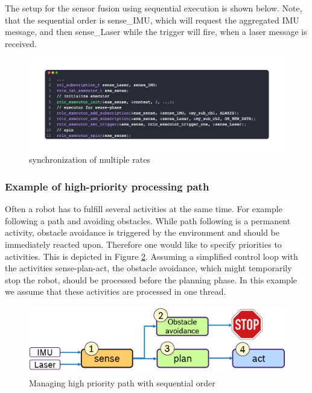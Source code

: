 The setup for the sensor fusion using sequential execution is shown below. Note, that the sequential order is sense\_IMU, which will request the aggregated IMU message, and then sense\_Laser while the trigger will fire, when a laser message is received.
\begin{figure}[htbp!]
    \centering
    \includegraphics[width=1\linewidth]{Img/code/example32.png}
    \caption{synchronization of multiple rates}\label{f:example32}
    \vspace{-0.1in}
\end{figure}

\subsubsection{Example of high-priority processing path}
Often a robot has to fulfill several activities at the same time. For example following a path and avoiding obstacles. While path following is a permanent activity, obstacle avoidance is triggered by the environment and should be immediately reacted upon. Therefore one would like to specify priorities to activities. This is depicted in Figure \ref{f:highPriorityPath}. Assuming a simplified control loop with the activities sense-plan-act, the obstacle avoidance, which might temporarily stop the robot, should be processed before the planning phase. In this example we assume that these activities are processed in one thread.
\begin{figure}[htb!]
    \centering
    \includegraphics[width=0.75\linewidth]{Img/highPriorityPath.png}
    \caption{Managing high priority path with sequential order}\label{f:highPriorityPath}
    \vspace{-0.1in}
\end{figure}


